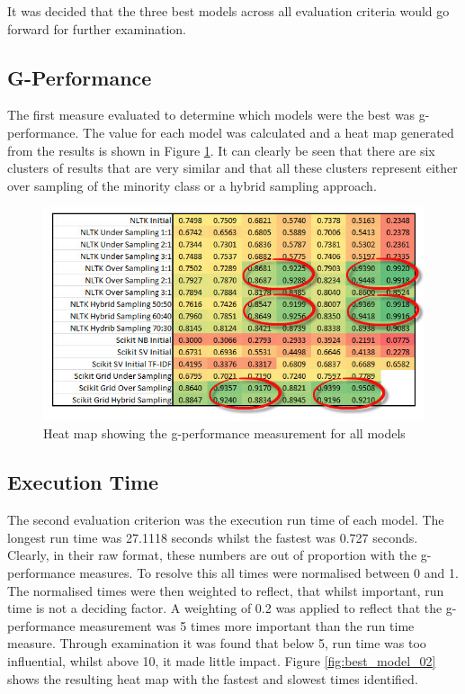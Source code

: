 It was decided that the three best models across all evaluation criteria would go forward for further examination.

\subsection{G-Performance}

The first measure evaluated to determine which models were the best was g-performance. The value for each model was calculated and a heat map generated from the results is shown in Figure \ref{fig:best_model_01}. It can clearly be seen that there are six clusters of results that are very similar and that all these clusters represent either over sampling of the minority class or a hybrid sampling approach.

\begin{figure}[htbp]
	\centering
	\includegraphics[width=1\textwidth]{Figures/Chapter5/best_model_01.jpg}
	\caption[Best Model - G-Performance heat map]{Heat map showing the g-performance measurement for all models}
	\label{fig:best_model_01}
\end{figure}

\subsection{Execution Time}

The second evaluation criterion was the execution run time of each model. The longest run time was 27.1118 seconds whilst the fastest was 0.727 seconds. Clearly, in their raw format, these numbers are out of proportion with the g-performance measures. To resolve this all times were normalised between 0 and 1. The normalised times were then weighted to reflect, that whilst important, run time is not a deciding factor. A weighting of 0.2 was applied to reflect that the g-performance measurement was 5 times more important than the run time measure. Through examination it was found that below 5, run time was too influential, whilst above 10, it made little impact. Figure \ref{fig:best_model_02} shows the resulting heat map with the fastest and slowest times identified. 

